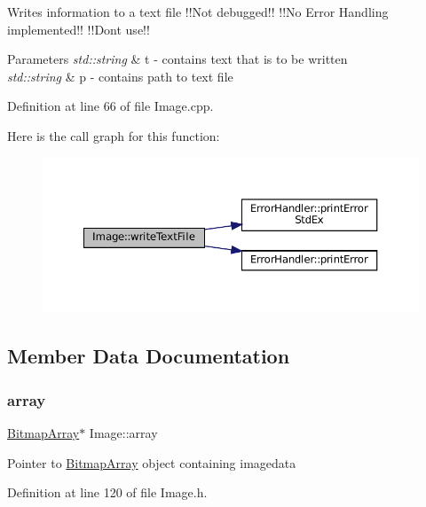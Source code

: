 Writes information to a text file !!\+Not debugged!! !!\+No Error Handling implemented!! !!\+Dont use!! 


\begin{DoxyParams}{Parameters}
{\em std\+::string} & t -\/ contains text that is to be written \\
\hline
{\em std\+::string} & p -\/ contains path to text file \\
\hline
\end{DoxyParams}


Definition at line 66 of file Image.\+cpp.

Here is the call graph for this function\+:
\nopagebreak
\begin{figure}[H]
\begin{center}
\leavevmode
\includegraphics[width=350pt]{classImage_a2dc30c9d6280b8c0edd2f4f0ab474a5c_cgraph}
\end{center}
\end{figure}


\subsection{Member Data Documentation}
\mbox{\label{classImage_a1c18dd7d9eda416d44e7eb408d5b3c38}} 
\subsubsection{\texorpdfstring{array}{array}}
{\footnotesize\ttfamily \mbox{\hyperlink{classBitmapArray}{Bitmap\+Array}}$\ast$ Image\+::array\hspace{0.3cm}{\ttfamily [private]}}

Pointer to \mbox{\hyperlink{classBitmapArray}{Bitmap\+Array}} object containing imagedata 

Definition at line 120 of file Image.\+h.

\mbox{\label{classImage_a560753c20e67a544be57bba971021375}} 
